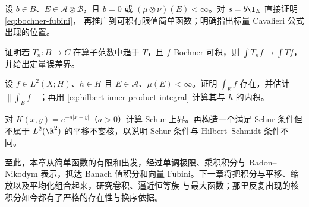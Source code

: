 \begin{exercise}\label{exercise:3-4-3-1}
设 $b\in B$、$E\in\mathcal A\otimes\mathcal B$，且 $b=0$ 或
$(\mu\otimes\nu)(E)<\infty$。对 $s=b\1_E$ 直接证明 \eqref{eq:bochner-fubini}，
再推广到可积有限值简单函数；明确指出标量
Cavalieri 公式出现的位置。
\end{exercise}
\begin{exercise}[算子交换]\label{exercise:3-4-3-2}
证明若 $T_n:B\to C$ 在算子范数中趋于 $T$，且 $f$ Bochner 可积，则
$\int T_nf\to\int Tf$，并给出定量误差界。
\end{exercise}
\begin{exercise}[Hilbert 配对]\label{exercise:3-4-3-3}
设 $f\in L^2(X;H)$、$h\in H$ 且 $E\in\mathcal A$、$\mu(E)<\infty$。证明
$\int_Ef$ 存在，并估计 $\|\int_Ef\|$；再用 \eqref{eq:hilbert-inner-product-integral} 计算其与
$h$ 的内积。
\end{exercise}
\begin{exercise}[Schur 测试]\label{exercise:3-4-3-4}
对 $K(x,y)=e^{-a|x-y|}$（$a>0$）计算 Schur 上界。再构造一个满足 Schur 条件但不属于
$L^2(\R^2)$ 的平移不变核，以说明 Schur 条件与 Hilbert--Schmidt 条件不同。
\end{exercise}

至此，本章从简单函数的有限和出发，经过单调极限、乘积积分与 Radon--Nikodym 表示，抵达
Banach 值积分和向量 Fubini。下一章将把积分与平移、缩放以及平均化组合起来，研究卷积、逼近恒等族
与最大函数；那里反复出现的核积分如今都有了严格的存在性与换序依据。

